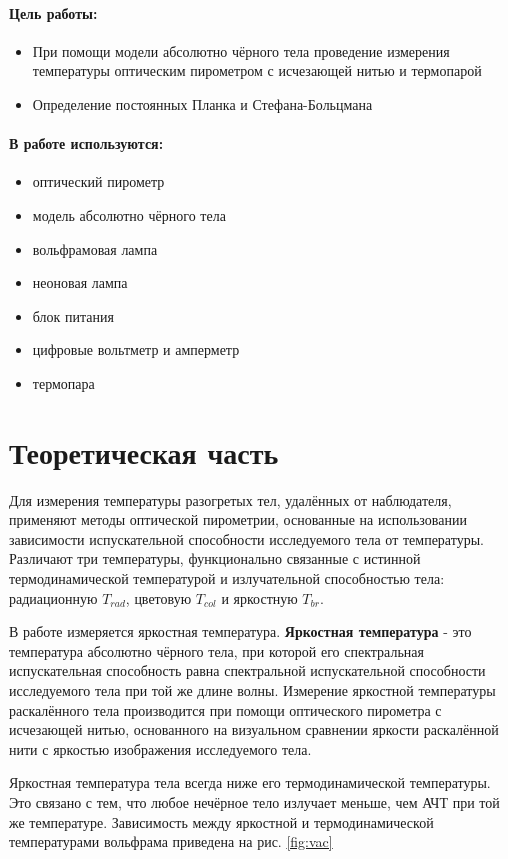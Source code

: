 


	


	\paragraph*{Цель работы:} 
	\begin{itemize}
		\item При помощи модели абсолютно чёрного тела проведение измерения температуры оптическим пирометром с исчезающей нитью и термопарой
		\item Определение постоянных Планка и Стефана-Больцмана
	\end{itemize}

	\paragraph*{В работе используются:}
	\begin{itemize}
		\item оптический пирометр
		\item модель абсолютно чёрного тела
		\item вольфрамовая лампа
		\item неоновая лампа
		\item блок питания
		\item цифровые вольтметр и амперметр
		\item термопара
	\end{itemize}

	\section*{Теоретическая часть}

	Для измерения температуры разогретых тел, удалённых от наблюдателя, применяют методы оптической пирометрии, основанные на использовании зависимости испускательной способности исследуемого тела от температуры. Различают три температуры, функционально связанные с истинной термодинамической температурой и излучательной способностью тела: радиационную $T_{rad}$, цветовую $T_{col}$ и яркостную $T_{br}$. \par
	В работе измеряется яркостная температура. \textbf{Яркостная температура} - это температура абсолютно чёрного тела, при которой его спектральная испускательная способность равна спектральной испускательной способности исследуемого тела при той же длине волны.
	Измерение яркостной температуры раскалённого тела производится при помощи оптического пирометра с исчезающей нитью, основанного на визуальном сравнении яркости раскалённой нити с яркостью изображения исследуемого тела. \par
	Яркостная температура тела всегда ниже его термодинамической температуры. Это связано с тем, что любое нечёрное тело излучает меньше, чем АЧТ при той же температуре. Зависимость между яркостной и термодинамической температурами вольфрама приведена на рис. \ref{fig:vac}

